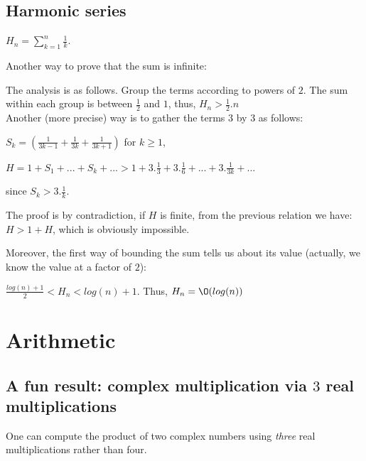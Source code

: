 \subsection{Harmonic series}

$H_{n} = \sum_{k=1}^{n} \frac{1}{k}$.

Another way to prove that the sum is infinite:
 
The analysis is as follows.
Group the terms according to powers of $2$. 
The sum within each group is between $\frac{1}{2}$ and $1$, thus,
$H_n > \frac{1}{2}.n$
\\

Another (more precise) way is to gather the terms 3 by 3 as follows:

$S_k = (\frac{1}{3k-1} + \frac{1}{3k} + \frac{1}{3k+1} )$ for $k\geq1$, 

$H = 1 + S_1 + ... + S_k + ... > 1 + 3.\frac{1}{3} + 3.\frac{1}{6} + ... + 3.\frac{1}{3k} + ... $

since $S_k > 3.\frac{1}{k} $.

The proof is by contradiction, if $H$ is finite, from the previous relation we have: $H > 1 + H$, which is obviously impossible.
\bigskip

Moreover, the first way of  bounding the sum tells us about its value (actually, we know the value at a factor of $2$):

$\frac{log(n)+1}{2} < H_n < log(n)+1$. Thus, $H_n = \O(log(n))$



\section{Arithmetic}

\subsection{A fun result: complex
  multiplication via $3$ real multiplications}

\begin{prop}
One can compute the product of two complex numbers using {\em three}
real multiplications rather than four.
\end{prop}

